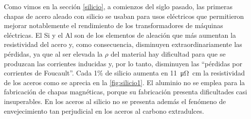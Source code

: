 \documentclass[12pt,a4paper]{article}
\begin{document}
Como vimos en la sección \ref{silicio}, a comienzos del siglo pasado, las primeras chapas de acero aleado con silicio se usaban para usos eléctricos que permitieron mejorar notablemente el rendimiento de los transformadores de máquinas eléctricas. El Si y el Al son de los elementos de aleación que más aumentan la resistividad del acero y, como consecuencia, disminuyen extraordinariamente las pérdidas, ya que al ser elevada la $\rho$ del material hay dificultad para que se produzcan las corrientes inducidas y, por lo tanto, disminuyen las \enquote{pérdidas por corrientes de Foucault}. Cada 1\% de silicio aumenta en \SI{11}{\micro\ohm\centi\metre} la resistividad de los aceros como se aprecia en la \autoref{fig:silicio1}. El aluminio no se emplea para la fabricación de chapas magnéticas, porque su fabricación presenta dificultades casi insuperables. En los aceros al silicio no se presenta además el fenómeno de envejecimiento tan perjudicial en los aceros al carbono extradulces.
\end{document}
